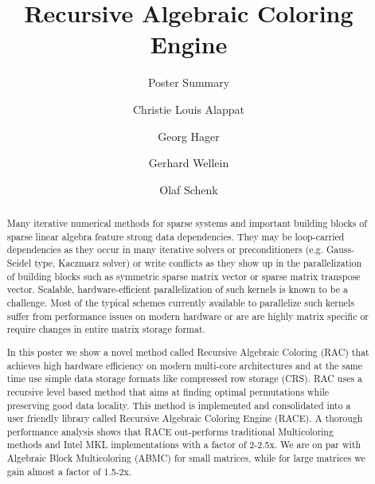 \documentclass[sigplan, review]{acmart}
\begin{document}
\title[RACE]{Recursive Algebraic Coloring Engine}
\subtitle{Poster Summary}

\author{Christie Louis Alappat}

\author{Georg Hager}

\author{Gerhard Wellein}

\author{Olaf Schenk}

\renewcommand{\shortauthors}{C. Alappat et al.}



\begin{abstract}
Many iterative numerical methods for sparse systems and important building blocks of sparse linear algebra feature strong data dependencies. They may be loop-carried dependencies as they occur in many iterative solvers or preconditioners (e.g. Gauss-Seidel type, Kaczmarz solver) or write conflicts as they show up in the parallelization of building blocks such as symmetric sparse matrix vector or sparse matrix transpose vector. Scalable, hardware-efficient parallelization of such kernels is known to be a challenge. Most of the typical schemes currently available to parallelize such kernels suffer from performance issues on modern hardware or are are highly matrix specific or require changes in entire matrix storage format.

In this poster we show a novel method called Recursive Algebraic Coloring (RAC) that achieves high hardware efficiency on modern multi-core architectures and at the same time use simple data storage formats like compressed row storage (CRS). RAC uses a recursive level based method that aims at finding optimal permutations while preserving good data locality. This method is implemented and consolidated into a user friendly library called Recursive Algebraic Coloring Engine (RACE). A thorough performance analysis shows that RACE out-performs traditional Multicoloring methods and Intel MKL implementations with a factor of 2-2.5x. We are on par with Algebraic Block Multicoloring (ABMC) for small matrices, while for large matrices we gain almost a factor of 1.5-2x.
\end{abstract}
\end{document}
